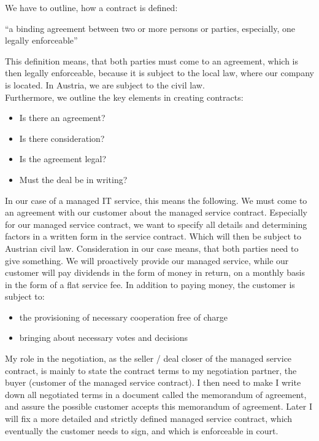 \noindent We have to outline, how a contract is defined:

\begin{center}
	\enquote{a binding agreement between two or more persons or parties, especially, one legally enforceable} \autocite{merriamWebsterDefinitionContract}
\end{center}

\noindent This definition means, that both parties must come to an agreement, which is then 
legally enforceable, because it is subject to the local law, where our company is located. 
In Austria, we are subject to the civil law. \\

\noindent Furthermore, we outline the key elements in creating contracts:

\begin{center}
	\begin{itemize}
		\item Is there an agreement?
		\item Is there consideration?
		\item Is the agreement legal?
		\item Must the deal be in writing?
	\end{itemize}
\end{center}

\noindent In our case of a managed IT service, this means the following. 
We must come to an agreement with our customer about the managed service contract.
Especially for our managed service contract, we want to specify all details and
determining factors in a written form in the service contract. Which will then
be subject to Austrian civil law. Consideration in our case means, that
both parties need to give something. We will proactively provide our managed service,
while our customer will pay dividends in the form of money in return, 
on a monthly basis in the form of a flat service fee. In addition to paying money,
the customer is subject to:

\begin{center}
	\begin{itemize}
		\item the provisioning of necessary cooperation free of charge
		\item bringing about necessary votes and decisions
	\end{itemize}
\end{center}

\noindent My role in the negotiation, as the seller / deal closer of the managed service contract,
is mainly to state the contract terms to my negotiation partner, the buyer
(customer of the managed service contract). I then need to make I write down
all negotiated terms in a document called the memorandum of agreement, and 
assure the possible customer accepts this memorandum of agreement.
Later I will fix a more detailed and strictly defined managed service contract,
which eventually the customer needs to sign,
and which is enforceable in court.

